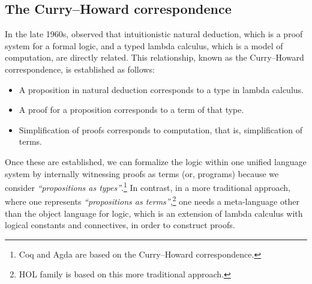 \subsection{The Curry--Howard correspondence}
In the late 1960s, \citet{Howard69} observed that intuitionistic
natural deduction, which is a proof system for a formal logic,
and a typed lambda calculus, which is a model of computation,
are directly related. This relationship, known as
the Curry--Howard correspondence, is established as follows:
\begin{itemize}
\item A proposition in natural deduction corresponds to
        a type in lambda calculus.
\item A proof for a proposition corresponds to a term of that type.
\item Simplification of proofs corresponds to computation,
        that is, simplification of terms.
\end{itemize}
Once these are established, we can formalize the logic within
one unified language system by internally witnessing proofs as terms
(or, programs) because we consider \emph{``propositions as types''}.\footnote{
	Coq and Agda are based on the Curry--Howard correspondence.}
In contrast, in a more traditional approach, where one represents
\emph{``propositions as terms''},\footnote{
	HOL family is based on this more traditional approach.}
one needs a meta-language other than the object language for logic,
which is an extension of lambda calculus with logical constants
and connectives, in order to construct proofs.

